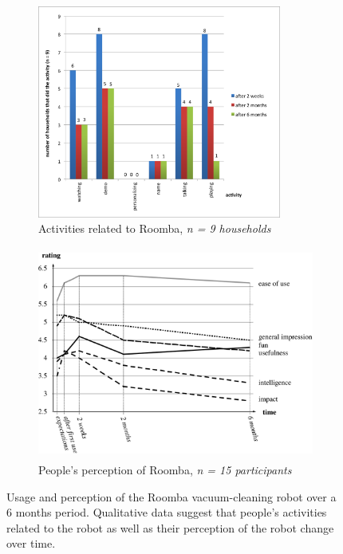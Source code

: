 \documentclass{frontiersSCNS} %
\begin{document}
\begin{figure}[b]
        \centering
        \begin{subfigure}[t]{0.48\columnwidth}
                \includegraphics[height=7cm]{roomba-activities}
                \caption{Activities related to Roomba, \textit{n = 9 households}}
                \label{fig:roomba-activities}
        \end{subfigure}%
        \hspace{0.5cm} 
        \begin{subfigure}[t]{0.48\columnwidth}
                \includegraphics[height=7cm]{roomba-ratings}
                \caption{People's perception of Roomba, \textit{n = 15
                participants}}
                \label{fig:roomba-perception}
        \end{subfigure}
    \caption{Usage and perception of the Roomba vacuum-cleaning robot over a 6
    months period. Qualitative data suggest that people's activities related to
    the robot as well as their perception of the robot change over time.}
    \label{fig:roomba}
\end{figure}
\end{document}
